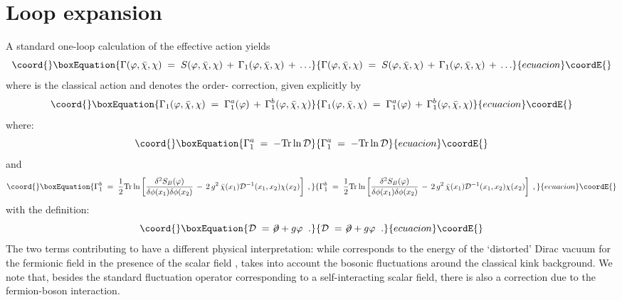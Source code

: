 \documentclass[a4paper,12pt]{article}
\begin{document}
\section{Loop expansion}\label{sec:loop}
A standard one-loop calculation of the effective action \myHighlight{$\Gamma$}\coordHE{}
yields~\cite{zinn}
\begin{equation}\coord{}\boxEquation{
  \label{eq:onel}
\Gamma(\varphi,{\bar\chi},\chi) \;=\; S(\varphi,{\bar\chi},\chi)
\,+\, \Gamma_1(\varphi,{\bar\chi},\chi) \,+\,\ldots
}{
  \Gamma(\varphi,{\bar\chi},\chi) \;=\; S(\varphi,{\bar\chi},\chi)
\,+\, \Gamma_1(\varphi,{\bar\chi},\chi) \,+\,\ldots
}{ecuacion}\coordE{}\end{equation}
where \coordHE{} is the classical action and \coordHE{} denotes the
order-\myHighlight{$\hbar$}\coordHE{} correction, given explicitly by
\begin{equation}\coord{}\boxEquation{
  \label{eq:defg1}
\Gamma_1(\varphi,{\bar\chi},\chi)\;=\; \Gamma_1^a (\varphi) \,+\, \Gamma_1^b(\varphi,{\bar\chi},\chi)
}{
  \Gamma_1(\varphi,{\bar\chi},\chi)\;=\; \Gamma_1^a (\varphi) \,+\, \Gamma_1^b(\varphi,{\bar\chi},\chi)
}{ecuacion}\coordE{}\end{equation} 
where:
\begin{equation}\coord{}\boxEquation{
  \label{eq:defg1a}
\Gamma_1^a \;=\; -{\rm Tr}\ln{\mathcal D}
}{
  \Gamma_1^a \;=\; -{\rm Tr}\ln{\mathcal D}
}{ecuacion}\coordE{}\end{equation}
and
\begin{equation}\coord{}\boxEquation{
  \label{eq:defg1b}
\Gamma_1^b\;=\;\frac{1}{2} {\rm Tr} \ln 
\left[ \frac{\delta^2 S_B(\varphi)}{\delta\phi(x_1)
\delta\phi(x_2)} \,-\,2 \, g^2 \, {\bar\chi}(x_1) {\mathcal D}^{-1}(x_1,x_2) 
\chi(x_2) \right] \;,
}{
  \Gamma_1^b\;=\;\frac{1}{2} {\rm Tr} \ln 
\left[ \frac{\delta^2 S_B(\varphi)}{\delta\phi(x_1)
\delta\phi(x_2)} \,-\,2 \, g^2 \, {\bar\chi}(x_1) {\mathcal D}^{-1}(x_1,x_2) 
\chi(x_2) \right] \;,
}{ecuacion}\coordE{}\end{equation}
with the definition:
\begin{equation}\coord{}\boxEquation{
  \label{eq:defcald1}
{\mathcal D}\;=\; \not \! \partial + g \varphi \;\;.
}{
  {\mathcal D}\;=\; \not \! \partial + g \varphi \;\;.
}{ecuacion}\coordE{}\end{equation}
The two terms contributing to \coordHE{} have a different physical
interpretation: while \coordHE{} corresponds to the energy of the
`distorted' Dirac vacuum for the fermionic field in the presence of
the scalar field \myHighlight{$\varphi$}\coordHE{}, \coordHE{} takes into account the bosonic
fluctuations around the classical kink background.  We note that,
besides the standard fluctuation operator
\coordHE{} corresponding to a self-interacting
scalar field, there is also a correction due to the fermion-boson
interaction.
 
\end{document}

